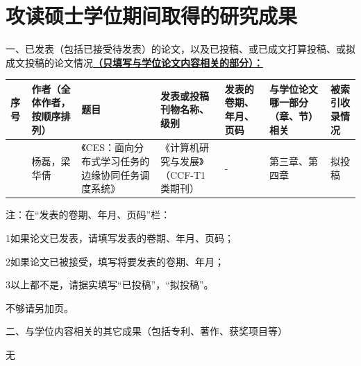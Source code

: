 \chapter{攻读硕士学位期间取得的研究成果} %
\pubfont %
一、已发表（包括已接受待发表）的论文，以及已投稿、或已成文打算投稿、或拟成文投稿的论文情况\underline{\textbf{（只填写与学位论文内容相关的部分）：}}
\begin{table}
	\centering{}%
	\pubfont 
	\begin{longtable}{|>{\centering}m{0.5cm}|>{\centering}m{2.0cm}|>{\centering}m{2.8cm}|>{\centering}m{2.5cm}|>{\centering}m{2.2cm}|>{\centering}m{2.0cm}|>{\centering}m{1.0cm}|}
		\hline 
		\textbf{序号} & \textbf{作者（全体作者，按顺序排列）} & \textbf{题目} & \textbf{发表或投稿刊物名称、级别} & \textbf{发表的卷期、年月、页码} & \textbf{与学位论文哪一部分（章、节）相关} &\textbf{被索引收录情况}\tabularnewline
		\hline 
		1& 杨磊，梁华倩 & 《CES：面向分布式学习任务的边缘协同任务调度系统》 & 《计算机研究与发展》（CCF-T1类期刊） & - & 第三章、第四章 & 拟投稿 \tabularnewline
		\hline 
	\end{longtable}
\end{table}


注：在“发表的卷期、年月、页码”栏：

1如果论文已发表，请填写发表的卷期、年月、页码；

2如果论文已被接受，填写将要发表的卷期、年月；

3以上都不是，请据实填写“已投稿”，“拟投稿”。

不够请另加页。

二、与学位内容相关的其它成果（包括专利、著作、获奖项目等）

无



\normalsize %